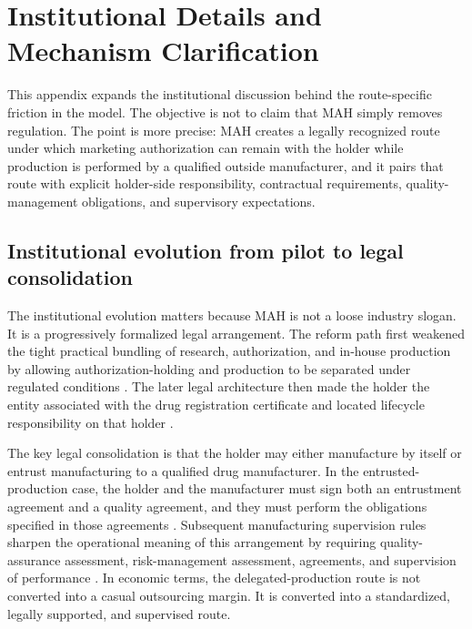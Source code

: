 \documentclass[12pt]{article}
\newcommand{\1}{\mathbf{1}}
\begin{document}
\section{Institutional Details and Mechanism Clarification}

This appendix expands the institutional discussion behind the route-specific friction in the model. The objective is not to claim that MAH simply removes regulation. The point is more precise: MAH creates a legally recognized route under which marketing authorization can remain with the holder while production is performed by a qualified outside manufacturer, and it pairs that route with explicit holder-side responsibility, contractual requirements, quality-management obligations, and supervisory expectations.

\subsection{Institutional evolution from pilot to legal consolidation}

The institutional evolution matters because MAH is not a loose industry slogan. It is a progressively formalized legal arrangement. The reform path first weakened the tight practical bundling of research, authorization, and in-house production by allowing authorization-holding and production to be separated under regulated conditions \citep{StateCouncilMAHPilot2016,CFDAMAHImplementation2016}. The later legal architecture then made the holder the entity associated with the drug registration certificate and located lifecycle responsibility on that holder \citep{DrugAdministrationLaw2019,NMPAHolderResponsibility2022}.

The key legal consolidation is that the holder may either manufacture by itself or entrust manufacturing to a qualified drug manufacturer. In the entrusted-production case, the holder and the manufacturer must sign both an entrustment agreement and a quality agreement, and they must perform the obligations specified in those agreements \citep{DrugAdministrationLaw2019}. Subsequent manufacturing supervision rules sharpen the operational meaning of this arrangement by requiring quality-assurance assessment, risk-management assessment, agreements, and supervision of performance \citep{NMPAManufacturing2022,NMPAEntrustedProduction2023}. In economic terms, the delegated-production route is not converted into a casual outsourcing margin. It is converted into a standardized, legally supported, and supervised route.
\end{document}
